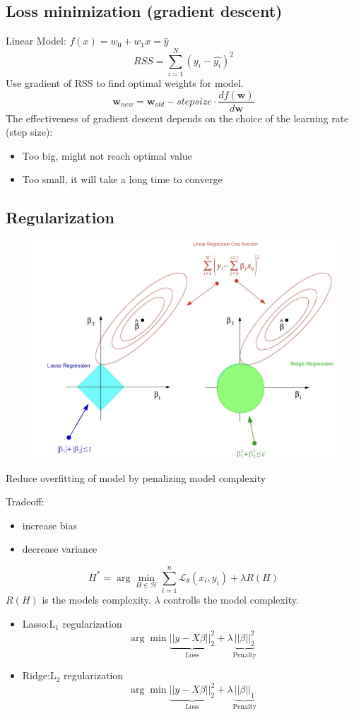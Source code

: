 \subsection{Loss minimization (gradient descent)}
Linear Model: \(f(x) = w_0 + w_1 x = \hat{y}\)
\[
RSS = \sum_{i = 1}^{N} (y_i - \hat{y_i})^2
\]
Use gradient of RSS to find optimal weights for model.
\[
\mathbf{w}_{new} = \mathbf{w}_{old}- stepsize \cdot \frac{df(\mathbf{w})}{d\mathbf{w}}
\]
The effectiveness of gradient descent depends on the choice of the learning rate (step size):
\begin{itemize}
    \item Too big, might not reach optimal value
    \item Too small, it will take a long time to converge
\end{itemize}
\subsection{Regularization}
\begin{figure}[!h]
    \includegraphics[width = \columnwidth]{figures/03/Regression.png}
\end{figure}

Reduce overfitting of model by penalizing model complexity

Tradeoff:
\begin{itemize}
    \item increase bias
    \item decrease variance
\end{itemize}
\[
H^* = \arg\min_{H \in \mathcal{H}}\sum_{i = 1}^{n}\mathcal{L}_\theta(x_i,y_i) + \lambda R(H)
\]
\(R(H)\) is the models complexity.
\(\lambda\) controlls the model complexity.
\begin{itemize}
    \item Lasso:\(\text{L}_1\) regularization
    \[
    \arg\min\underbrace{||y-X\beta||_2^2}_{\text{Loss}} + \lambda\underbrace{||\beta||_2^2}_{\text{Penalty}}
    \]
    \item Ridge:\(\text{L}_2\) regularization
    \[
    \arg\min\underbrace{||y-X\beta||_2^2}_{\text{Loss}} + \lambda\underbrace{||\beta||_1}_{\text{Penalty}}
    \]
\end{itemize}

